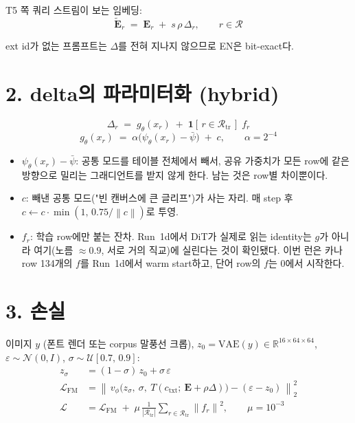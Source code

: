 \documentclass[11pt,a4paper]{article}
\newcommand{\Emb}{\mathbf{E}}
\newcommand{\R}{\mathcal{R}}
\newcommand{\Rtr}{\mathcal{R}_{\mathrm{tr}}}
\newcommand{\ind}{\mathbf{1}}
\newcommand{\norm}[1]{\left\lVert #1 \right\rVert}
\begin{document}
T5 쪽 쿼리 스트림이 보는 임베딩:
\begin{equation}
  \tilde{\Emb}_r \;=\; \Emb_r \;+\; s\,\rho\,\Delta_r ,
  \qquad r \in \R
\end{equation}

ext id가 없는 프롬프트는 $\Delta$를 전혀 지나지 않으므로 EN은 bit-exact다.

\section*{2. delta의 파라미터화 (hybrid)}

\begin{equation}
  \Delta_r \;=\; g_\theta(x_r) \;+\; \ind[\,r \in \Rtr\,]\; f_r
\end{equation}
\begin{equation}
  g_\theta(x_r) \;=\; \alpha\bigl(\psi_\theta(x_r) - \bar\psi\bigr) \;+\; c ,
  \qquad \alpha = 2^{-4}
\end{equation}

\begin{itemize}[leftmargin=14pt,itemsep=1pt]
  \item $\psi_\theta(x_r) - \bar\psi$: 공통 모드를 테이블 전체에서 빼서, 공유 가중치가 모든 row에 같은 방향으로 밀리는 그래디언트를 받지 않게 한다. 남는 것은 row별 차이뿐이다.
  \item $c$: 빼낸 공통 모드("빈 캔버스에 큰 글리프")가 사는 자리. 매 step 후 $c \leftarrow c\cdot\min(1,\,0.75/\norm{c})$로 투영.
  \item $f_r$: 학습 row에만 붙는 잔차. Run~1d에서 DiT가 실제로 읽는 identity는 $g$가 아니라 여기(노름 $\approx 0.9$, 서로 거의 직교)에 실린다는 것이 확인됐다. 이번 런은 카나 row 134개의 $f$를 Run~1d에서 warm start하고, 단어 row의 $f$는 0에서 시작한다.
\end{itemize}

\section*{3. 손실}

이미지 $y$ (폰트 렌더 또는 corpus 말풍선 크롭), $z_0 = \mathrm{VAE}(y) \in \mathbb{R}^{16\times64\times64}$, $\varepsilon \sim \mathcal{N}(0, I)$, $\sigma \sim \mathcal{U}[0.7,\,0.9]$:
\begin{align}
  z_\sigma &= (1-\sigma)\, z_0 + \sigma\,\varepsilon \\
  \mathcal{L}_{\mathrm{FM}} &= \norm{\, v_\phi\bigl(z_\sigma,\ \sigma,\ T(c_{\mathrm{txt}};\ \Emb + \rho\Delta)\bigr) - (\varepsilon - z_0) \,}_2^2 \\
  \mathcal{L} &= \mathcal{L}_{\mathrm{FM}} \;+\; \mu\,\frac{1}{|\Rtr|}\sum_{r\in\Rtr}\norm{f_r}^2 ,
  \qquad \mu = 10^{-3}
\end{align}
\end{document}
